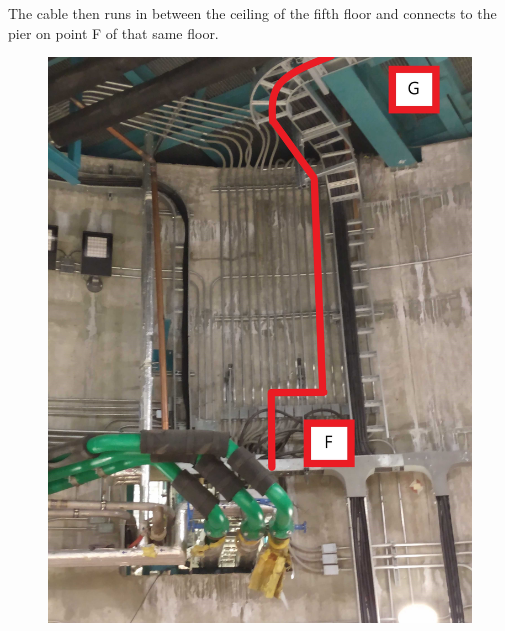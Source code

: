 The cable then runs in between the ceiling of the fifth floor and connects to the pier on point F of that same floor.

\begin{figure}
  \includegraphics[width=\textwidth]{images/19.jpg}
  \label{fig:jlsimon}
\end{figure}

